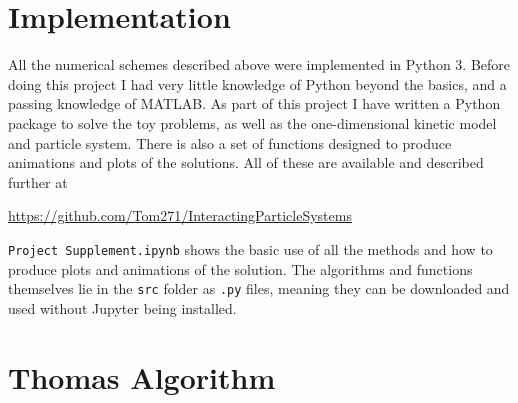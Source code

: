 \documentclass[11pt, a4paper]{article}
\begin{document}
    \section{Implementation}\label{app:code}
    All the numerical schemes described above were implemented in Python 3. Before doing this project I had very little knowledge of Python beyond the basics, and a passing knowledge of MATLAB. As part of this project I have written a Python package to solve the toy problems, as well as the one-dimensional kinetic model and particle system. There is also a set of functions designed to produce animations and plots of the solutions. All of these are available and described further at 
    \begin{center}\url{https://github.com/Tom271/InteractingParticleSystems}\end{center}
    \texttt{Project Supplement.ipynb} shows the basic use of all the methods and how to produce plots and animations of the solution. The algorithms and functions themselves lie in the \texttt{src} folder as \texttt{.py} files, meaning they can be downloaded and used without Jupyter being installed.
 
    \section{Thomas Algorithm}\label{app:thomas}
    
\end{document}
